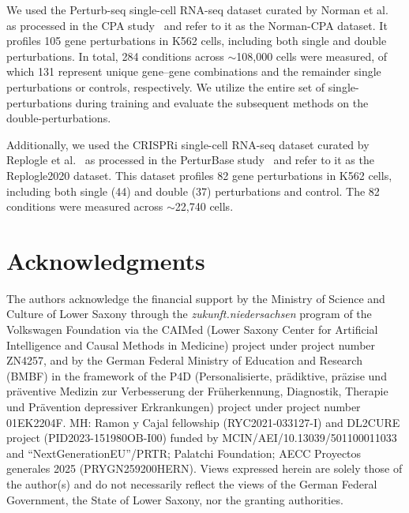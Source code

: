 \documentclass[10pt,letterpaper]{article}
\theoremstyle{definition}
\theoremstyle{remark}
\begin{document}
We used the Perturb-seq single-cell RNA-seq dataset curated by Norman et al.~\cite{norman2019exploring} as processed in the CPA study~\cite{lotfollahi_predicting_2023} and refer to it as the Norman-CPA dataset.
It profiles 105 gene perturbations in K562 cells, including both single and double perturbations.
In total, 284 conditions across $\sim$108{,}000 cells were measured, of which 131 represent unique gene--gene combinations and the remainder single perturbations or controls, respectively.
We utilize the entire set of single-perturbations during training and evaluate the subsequent methods on the double-perturbations.

Additionally, we used the CRISPRi single-cell RNA-seq dataset curated by Replogle et al.~\cite{replogle_combinatorial_2020} as processed in the PerturBase study~\cite{wei_perturbase_2024} and refer to it as the Replogle2020 dataset.
This dataset profiles 82 gene perturbations in K562 cells, including both single (44) and double (37) perturbations and control.
The 82 conditions were measured across $\sim$22{,}740 cells.




\section*{Acknowledgments}
The authors acknowledge the financial support by the Ministry of Science and Culture of Lower Saxony through the \textit{zukunft.niedersachsen} program of the Volkswagen Foundation via the CAIMed (Lower Saxony Center for Artificial Intelligence and Causal Methods in Medicine) project under project number ZN4257, and by the German Federal Ministry of Education and Research (BMBF) in the framework of the P4D (Personalisierte, pr\"adiktive, pr\"azise und pr\"aventive Medizin zur Verbesserung der Fr\"uherkennung, Diagnostik, Therapie und Pr\"avention depressiver Erkrankungen) project under project number 01EK2204F.
MH: Ramon y Cajal fellowship (RYC2021-033127-I) and DL2CURE project (PID2023-151980OB-I00) funded by MCIN/AEI/10.13039/501100011033 and ``NextGenerationEU''/PRTR; Palatchi Foundation; AECC Proyectos generales 2025 (PRYGN259200HERN).
Views expressed herein are solely those of the author(s) and do not necessarily reflect the views of the German Federal Government, the State of Lower Saxony, nor the granting authorities.
\end{document}
